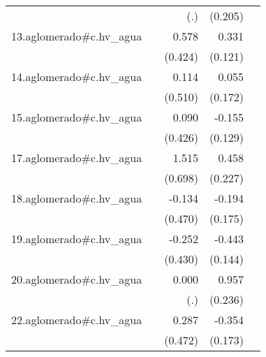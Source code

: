 {\begin{longtable}{l*{4}{D{.}{.}{-1}}}
            &                     &         (.)         &     (0.205)         &                     \\
\addlinespace
13.aglomerado#c.hv\_agua&                     &       0.578         &       0.331\sym{**} &                     \\
            &                     &     (0.424)         &     (0.121)         &                     \\
\addlinespace
14.aglomerado#c.hv\_agua&                     &       0.114         &       0.055         &                     \\
            &                     &     (0.510)         &     (0.172)         &                     \\
\addlinespace
15.aglomerado#c.hv\_agua&                     &       0.090         &      -0.155         &                     \\
            &                     &     (0.426)         &     (0.129)         &                     \\
\addlinespace
17.aglomerado#c.hv\_agua&                     &       1.515\sym{*}  &       0.458\sym{*}  &                     \\
            &                     &     (0.698)         &     (0.227)         &                     \\
\addlinespace
18.aglomerado#c.hv\_agua&                     &      -0.134         &      -0.194         &                     \\
            &                     &     (0.470)         &     (0.175)         &                     \\
\addlinespace
19.aglomerado#c.hv\_agua&                     &      -0.252         &      -0.443\sym{**} &                     \\
            &                     &     (0.430)         &     (0.144)         &                     \\
\addlinespace
20.aglomerado#c.hv\_agua&                     &       0.000         &       0.957\sym{***}&                     \\
            &                     &         (.)         &     (0.236)         &                     \\
\addlinespace
22.aglomerado#c.hv\_agua&                     &       0.287         &      -0.354\sym{*}  &                     \\
            &                     &     (0.472)         &     (0.173)         &                     \\

\end{longtable}}

